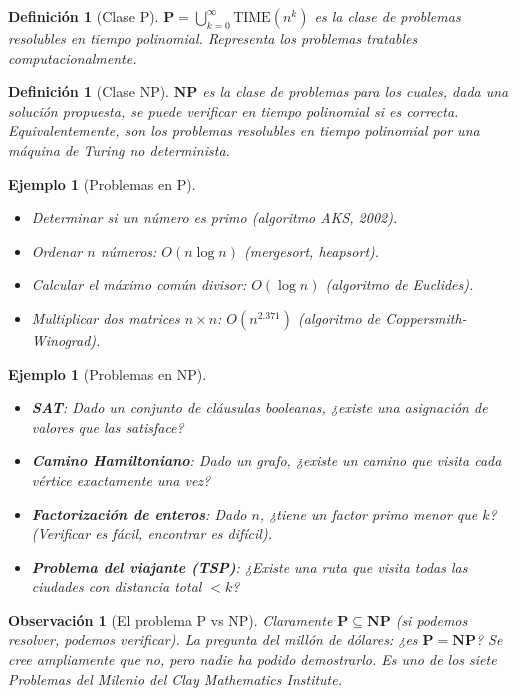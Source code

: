 \documentclass[a4paper,11pt]{report}
\newtheorem{definition}[theorem]{Definición}
\newtheorem{example}[theorem]{Ejemplo}
\newtheorem{remark}[theorem]{Observación}
\begin{document}
\begin{definition}[Clase P]
$\mathbf{P} = \bigcup_{k=0}^\infty \text{TIME}(n^k)$ es la clase de problemas resolubles en tiempo polinomial. Representa los problemas \textit{tratables} computacionalmente.
\end{definition}

\begin{definition}[Clase NP]
$\mathbf{NP}$ es la clase de problemas para los cuales, dada una solución propuesta, se puede \textit{verificar} en tiempo polinomial si es correcta. Equivalentemente, son los problemas resolubles en tiempo polinomial por una máquina de Turing \textit{no determinista}.
\end{definition}

\begin{example}[Problemas en P]
\begin{itemize}
\item Determinar si un número es primo (algoritmo AKS, 2002).
\item Ordenar $n$ números: $O(n \log n)$ (mergesort, heapsort).
\item Calcular el máximo común divisor: $O(\log n)$ (algoritmo de Euclides).
\item Multiplicar dos matrices $n \times n$: $O(n^{2.371})$ (algoritmo de Coppersmith-Winograd).
\end{itemize}
\end{example}

\begin{example}[Problemas en NP]
\begin{itemize}
\item \textbf{SAT}: Dado un conjunto de cláusulas booleanas, ¿existe una asignación de valores que las satisface?
\item \textbf{Camino Hamiltoniano}: Dado un grafo, ¿existe un camino que visita cada vértice exactamente una vez?
\item \textbf{Factorización de enteros}: Dado $n$, ¿tiene un factor primo menor que $k$? (Verificar es fácil, encontrar es difícil).
\item \textbf{Problema del viajante (TSP)}: ¿Existe una ruta que visita todas las ciudades con distancia total $< k$?
\end{itemize}
\end{example}

\begin{remark}[El problema P vs NP]
Claramente $\mathbf{P} \subseteq \mathbf{NP}$ (si podemos resolver, podemos verificar). La pregunta del millón de dólares: ¿es $\mathbf{P} = \mathbf{NP}$? Se cree ampliamente que no, pero nadie ha podido demostrarlo. Es uno de los siete Problemas del Milenio del Clay Mathematics Institute.
\end{remark}
\end{document}

